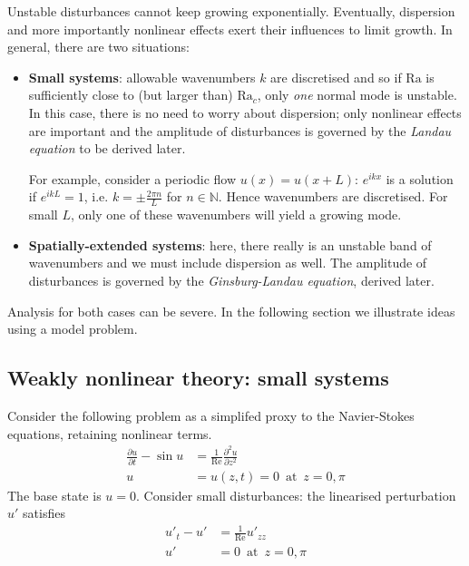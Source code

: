 \documentclass{jknotes}
\newcommand{\Ra}{\text{Ra}}
\newcommand{\ReN}{\text{Re}}
\begin{document}
Unstable disturbances cannot keep growing exponentially. Eventually,
dispersion and more importantly nonlinear effects exert their influences to
limit growth. In general, there are two situations:
\begin{itemize}
	\item \textbf{Small systems}: allowable wavenumbers $k$ are discretised
		and so if $\Ra$ is sufficiently close to (but larger than) $\Ra_c$,
		only \emph{one} normal mode is unstable. In this case, there is no
		need to worry about dispersion; only nonlinear effects are important
		and the amplitude of disturbances is governed by the \emph{Landau
		equation} to be derived later.

		For example, consider a periodic flow $u(x) = u(x+L)$: $e^{ikx}$ is a
		solution if $e^{ikL} = 1$, i.e. $k = \pm \frac{2\pi n}{L}$ for $n \in
		\mathbb{N}$. Hence wavenumbers are discretised. For small $L$, only
		one of these wavenumbers will yield a growing mode.
		\begin{center}
		\end{center}
	\item \textbf{Spatially-extended systems}: here, there really is an
		unstable band of wavenumbers and we must include dispersion as well.
		The amplitude of disturbances is governed by the \emph{Ginsburg-Landau
		equation}, derived later.
\end{itemize}

Analysis for both cases can be severe. In the following section we illustrate
ideas using a model problem.

\subsection{Weakly nonlinear theory: small systems}
Consider the following problem as a simplifed proxy to the Navier-Stokes
equations, retaining nonlinear terms. 
\begin{align}
	\frac{\partial u}{\partial t} - \sin u &= \frac{1}{\ReN} \frac{\partial^2
	u}{\partial z^2} \label{eq:l15:1}\\
		u &= u(z,t) = 0 \,\,\,\text{at}\,\,\, z=0,\pi
\end{align}
The base state is $u=0$. Consider small disturbances: the linearised
perturbation $u'$ satisfies
\begin{align}
	u'_t - u' &= \frac{1}{\ReN} u'_{zz} \\
	u' &= 0 \,\,\,\text{at}\,\,\,z=0,\pi
\end{align}
\end{document}
